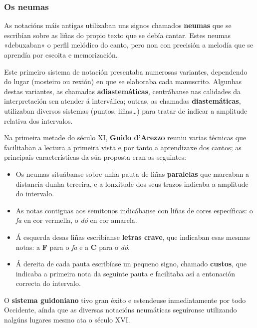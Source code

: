 \documentclass[spanish, a4paper,nobind]{templates/ociamthesis}
\providecommand{\tightlist}{%
  \setlength{\itemsep}{0pt}\setlength{\parskip}{0pt}}
\begin{document}
\hypertarget{os-neumas}{%
\subsubsection*{Os neumas}\label{os-neumas}}

As notacións máis antigas utilizaban uns signos chamados \textbf{neumas} que se escribían sobre as liñas do propio texto que se debía cantar. Estes neumas «debuxaban» o perfil melódico do canto, pero non con precisión a melodía que se aprendía por escoita e memorización.

Este primeiro sistema de notación presentaba numerosas variantes, dependendo do lugar (mosteiro ou rexión) en que se elaboraba cada manuscrito. Algunhas destas variantes, as chamadas \textbf{adiastemáticas}, centrábanse nas calidades da interpretación sen atender á interválica; outras, as chamadas \textbf{diastemáticas}, utilizaban diversos sistemas (puntos, liñas\ldots) para tratar de indicar a amplitude relativa dos intervalos.

Na primeira metade do século XI, \textbf{Guido d'Arezzo} reuniu varias técnicas que facilitaban a lectura a primeira vista e por tanto a aprendizaxe dos cantos; as principais características da súa proposta eran as seguintes:

\begin{itemize}
\tightlist
\item
  Os neumas situábanse sobre unha pauta de liñas \textbf{paralelas} que marcaban a distancia dunha terceira, e a lonxitude dos seus trazos indicaba a amplitude do intervalo.
\item
  As notas contiguas aos semitonos indicábanse con liñas de cores específicas: o \emph{fa} en cor vermella, o \emph{dó} en cor amarela.
\item
  Á esquerda desas liñas escribíanse \textbf{letras crave}, que indicaban esas mesmas notas: a \textbf{F} para o \emph{fa} e a \textbf{C} para o \emph{dó}.
\item
  Á dereita de cada pauta escribíase un pequeno signo, chamado \textbf{custos}, que indicaba a primeira nota da seguinte pauta e facilitaba así a entonación correcta do intervalo.
\end{itemize}

O \textbf{sistema guidoniano} tivo gran éxito e estendeuse inmediatamente por todo Occidente, aínda que as diversas notacións neumáticas seguíronse utilizando nalgúns lugares mesmo ata o século XVI.
\end{document}
